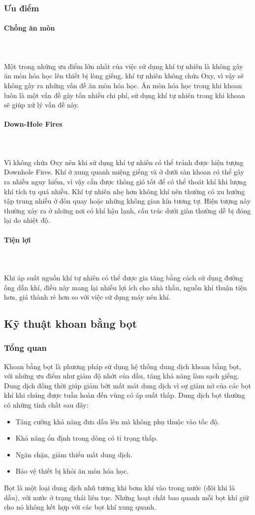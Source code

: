 \documentclass[12pt,a4paper]{article}
\newcommand{\subsubsubsection}[1]{\paragraph{#1}\mbox{}\\}
\begin{document}
\subsubsection{Ưu điểm}
\subsubsubsection{Chống ăn mòn}\\
	Một trong những ưu điểm lớn nhất của việc sử dụng khí tự nhiên là không gây ăn mòn hóa học lên thiết bị lòng giếng, khí tự nhiên không chứa Oxy, vì vậy sẽ không gây ra những vấn đề ăn mòn hóa học. Ăn mòn hóa học trong khi khoan luôn là một vấn đề gây tốn nhiều chi phí, sử dụng khí tự nhiên trong khi khoan sẽ giúp xử lý vấn đề này.
\subsubsubsection{Down-Hole Fires}\\
	Vì không chứa Oxy nên khi sử dụng khí tự nhiên có thể tránh được hiện tượng Downhole Fires.
	Khí ở xung quanh miệng giếng và ở dưới sàn khoan có thể gây ra nhiều nguy hiểm, vì vậy cần được thông gió tốt để có thể thoát khí khi lượng khí tích tụ quá nhiều. Khí tự nhiên nhẹ hơn không khí nên thường có xu hướng tập trung nhiều ở đòn quay hoặc những không gian kín tương tự. Hiện tượng này thường xảy ra ở những nơi có khí hậu lạnh, cấu trúc dưới giàn thường dễ bị đóng lại do nhiệt độ.
\subsubsubsection{Tiện lợi}\\
	Khi áp suất nguồn khí tự nhiên có thể được gia tăng bằng cách sử dụng đường ống dẫn khí, điều này mang lại nhiều lợi ích cho nhà thầu, nguồn khí thuận tiện hơn, giá thành rẻ hơn so với việc sử dụng máy nén khí.
\subsection{Kỹ thuật khoan bằng bọt}
\subsubsection{Tổng quan}
	Khoan bằng bọt là phương pháp sử dụng hệ thống dung dịch khoan bằng bọt, với những ưu điểm như giảm độ nhớt của dầu, tăng khả năng làm sạch giếng. Dung dịch đồng thời giúp giảm bớt mất mát dung dịch vì sự giảm nở của các bọt khí khi chúng được tuần hoàn đến vùng có áp suất thấp. Dung dịch bọt thường có những tính chất sau đây:
	\begin{itemize}
		\item Tăng cường khả năng đưa dầu lên mà không phụ thuộc vào tốc độ.
		\item Khả năng ổn định trong dòng có tỉ trọng thấp.
		\item Ngăn chặn, giảm thiểu mất dung dịch.
		\item Bảo vệ thiết bị khỏi ăn mòn hóa học.
	\end{itemize}
	Bọt là một loại dung dịch nhũ tương khi bơm khí vào trong nước (đôi khi là dầu), với nước ở trạng thái liên tục. Những hoạt chất bao quanh mỗi bọt khí giữ cho nó không kết hợp với các bọt khí xung quanh.
\end{document}
